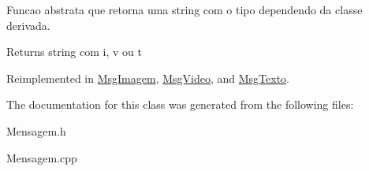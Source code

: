 Funcao abstrata que retorna uma string com o tipo dependendo da classe derivada. 

\begin{DoxyReturn}{Returns}
string com i, v ou t 
\end{DoxyReturn}


Reimplemented in \hyperlink{class_msg_imagem_a031cfa1eb0a38eb9f95d2d3b5e569c2e}{Msg\+Imagem}, \hyperlink{class_msg_video_ae5bb59188c75751e655afcc29578380f}{Msg\+Video}, and \hyperlink{class_msg_texto_acd54b047498f468c1f57a694c1bea591}{Msg\+Texto}.



The documentation for this class was generated from the following files\+:\begin{DoxyCompactItemize}
\item 
Mensagem.\+h\item 
Mensagem.\+cpp\end{DoxyCompactItemize}
